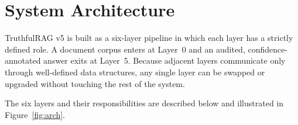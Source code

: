 

\section{System Architecture}

TruthfulRAG v5 is built as a six-layer pipeline in which each layer has a
strictly defined role. A document corpus enters at Layer~0 and an audited,
confidence-annotated answer exits at Layer~5. Because adjacent layers
communicate only through well-defined data structures, any single layer can
be swapped or upgraded without touching the rest of the system.

The six layers and their responsibilities are described below and illustrated
in Figure~\ref{fig:arch}.

